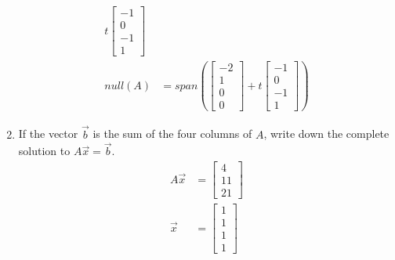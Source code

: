 \documentclass{math}
\begin{document}
\begin{enumerate}
\begin{align*}
      t\begin{bmatrix}-1 \\ 0 \\ -1 \\ 1\end{bmatrix} \\
    null(A) &= span\left(\begin{bmatrix}-2 \\ 1 \\ 0 \\ 0\end{bmatrix}+
      t\begin{bmatrix}-1 \\ 0 \\ -1 \\ 1\end{bmatrix}\right)
  \end{align*}
  \item If the vector \( \vec{b} \) is the sum of the four columns of \( A \),
  write down the complete solution to \( A\vec{x} = \vec{b} \).
  \begin{align*}
    A\vec{x} &= \begin{bmatrix}4 \\ 11 \\ 21\end{bmatrix} \\
    \vec{x} &= \begin{bmatrix}1 \\ 1 \\ 1 \\ 1\end{bmatrix}
  \end{align*}
\end{enumerate}
\end{document}
